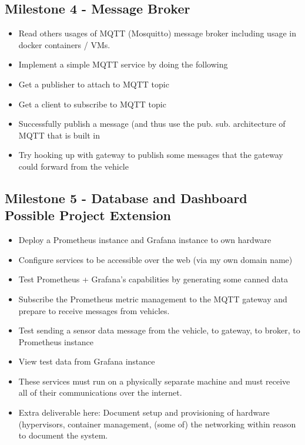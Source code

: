 \subsection{Milestone 4 - Message Broker}
\begin{itemize}
\setlength\itemsep{-0.5em}
    \item Read others usages of MQTT (Mosquitto) message broker including usage in docker containers / VMs.
    \item Implement a simple MQTT service by doing the following
    \item Get a publisher to attach to MQTT topic
    \item Get a client to subscribe to MQTT topic
    \item Successfully publish a message (and thus use the pub. sub. architecture of MQTT that is built in
    \item Try hooking up with gateway to publish some messages that the gateway could forward from the vehicle
\end{itemize}

\subsection{Milestone 5 - Database and Dashboard \textbf{Possible Project Extension}}
\begin{itemize}
\setlength\itemsep{-0.5em}
    \item Deploy a Prometheus instance and Grafana instance to own hardware
    \item Configure services to be accessible over the web (via my own domain name)
    \item Test Prometheus + Grafana's capabilities by generating some canned data
    \item Subscribe the Prometheus metric management to the MQTT gateway and prepare to receive messages from vehicles.
    \item Test sending a sensor data message from the vehicle, to gateway, to broker, to Prometheus instance
    \item View test data from Grafana instance
    \item These services must run on a physically separate machine and must receive all of their communications over the internet.
    \item Extra deliverable here: Document setup and provisioning of hardware (hypervisors, container management, (some of) the networking within reason to document the system.
\end{itemize}